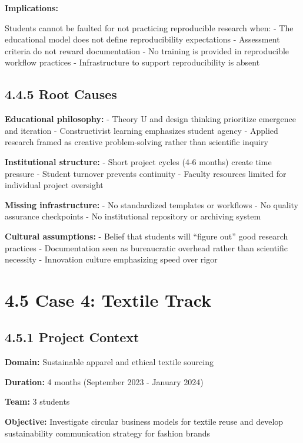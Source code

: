 \documentclass[
  oneside,
  open=any]{scrbook}
\begin{document}
\textbf{Implications:}

Students cannot be faulted for not practicing reproducible research
when: - The educational model does not define reproducibility
expectations - Assessment criteria do not reward documentation - No
training is provided in reproducible workflow practices - Infrastructure
to support reproducibility is absent

\subsection{4.4.5 Root Causes}\label{root-causes-2}

\textbf{Educational philosophy:} - Theory U and design thinking
prioritize emergence and iteration - Constructivist learning emphasizes
student agency - Applied research framed as creative problem-solving
rather than scientific inquiry

\textbf{Institutional structure:} - Short project cycles (4-6 months)
create time pressure - Student turnover prevents continuity - Faculty
resources limited for individual project oversight

\textbf{Missing infrastructure:} - No standardized templates or
workflows - No quality assurance checkpoints - No institutional
repository or archiving system

\textbf{Cultural assumptions:} - Belief that students will ``figure
out'' good research practices - Documentation seen as bureaucratic
overhead rather than scientific necessity - Innovation culture
emphasizing speed over rigor

\section{4.5 Case 4: Textile Track}\label{case-4-textile-track}

\subsection{4.5.1 Project Context}\label{project-context-3}

\textbf{Domain:} Sustainable apparel and ethical textile sourcing

\textbf{Duration:} 4 months (September 2023 - January 2024)

\textbf{Team:} 3 students

\textbf{Objective:} Investigate circular business models for textile
reuse and develop sustainability communication strategy for fashion
brands
\end{document}
